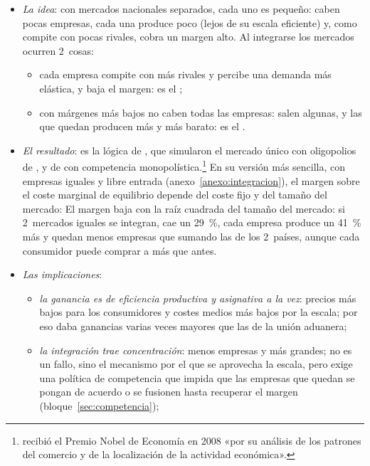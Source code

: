 \documentclass[11pt]{article}
\begin{document}
\begin{itemize}
\item \emph{La idea}: con mercados nacionales separados, cada uno es pequeño: caben pocas empresas, cada una produce poco (lejos de su escala eficiente) y, como compite con pocas rivales, cobra un margen alto. Al integrarse los mercados ocurren 2~cosas:
  \begin{itemize}
  \item cada empresa compite con más rivales y percibe una demanda más elástica, y baja el margen: es el ;
  \item con márgenes más bajos no caben todas las empresas: salen algunas, y las que quedan producen más y más barato: es el .
  \end{itemize}
\item \emph{El resultado}: es la lógica de \textcite{SmithVenables1988Completing}, que simularon el mercado único con oligopolios de , y de \textcite{Krugman1979Increasing} con competencia monopolística.\footnote{ recibió el Premio Nobel de Economía en 2008 «por su análisis de los patrones del comercio y de la localización de la actividad económica»\nocite{Nobel2008Krugman}.} En su versión más sencilla, con empresas iguales y libre entrada (anexo~\ref{anexo:integracion}), el margen sobre el coste marginal de equilibrio depende del coste fijo y del tamaño del mercado:
  El margen baja con la raíz cuadrada del tamaño del mercado: si 2~mercados iguales se integran, cae un 29~\%, cada empresa produce un 41~\% más y quedan menos empresas que sumando las de los 2~países, aunque cada consumidor puede comprar a más que antes.
\item \emph{Las implicaciones}:
  \begin{itemize}
  \item \emph{la ganancia es de eficiencia productiva y asignativa a la vez}: precios más bajos para los consumidores y costes medios más bajos por la escala; por eso  daba ganancias varias veces mayores que las de la unión aduanera;
  \item \emph{la integración trae concentración}: menos empresas y más grandes; no es un fallo, sino el mecanismo por el que se aprovecha la escala, pero exige una política de competencia que impida que las empresas que quedan se pongan de acuerdo o se fusionen hasta recuperar el margen (bloque~\ref{sec:competencia});

\end{itemize}
\end{itemize}
\end{document}
